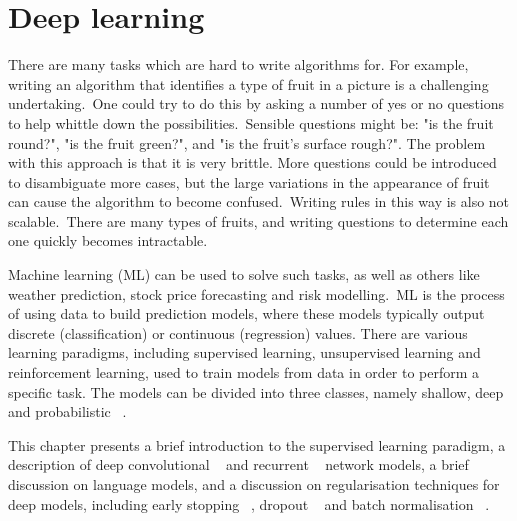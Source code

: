 
\chapter{Deep learning}

\ifpdf
     \graphicspath{{Figs/Chapter2/}}
\else
    \graphicspath{{Chapter2/Figs/Vector/}{Chapter2/Figs/}}
\fi


There are many tasks which are hard to write algorithms for. For example, writing an algorithm that identifies a type of fruit in a picture is a challenging undertaking.\ One could try to do this by asking a number of yes or no questions to help whittle down the possibilities.\ Sensible questions might be: "is the fruit round?", "is the fruit green?", and "is the fruit's surface rough?". The problem with this approach is that it is very brittle. More questions could be introduced to disambiguate more cases, but the large variations in the appearance of fruit can cause the algorithm to become confused.\ Writing rules in this way is also not scalable.\ There are many types of fruits, and writing questions to determine each one quickly becomes intractable. \par
 
\noindent Machine learning (ML) can be used to solve such tasks, as well as others like weather prediction, stock price forecasting and risk modelling.\ ML is the process of using data to build prediction models, where these models typically output discrete (classification) or continuous (regression) values. There are various learning paradigms, including supervised learning, unsupervised learning and reinforcement learning, used to train models from data in order to perform a specific task. The models can be divided into three classes, namely shallow, deep and probabilistic ~\citep{hastie2009elements}. \par

\noindent This chapter presents a brief introduction to the supervised learning paradigm, a description of deep convolutional \unskip ~\citep{lecun1998gradient} and recurrent \unskip ~\citep{werbos1988generalization} network models, a brief discussion on language models, and a discussion on regularisation techniques for deep models, including early stopping \unskip~\citep{prechelt1998early}, dropout \unskip ~\citep{srivastava2014dropout} and batch normalisation \unskip ~\citep{ioffe2015batch}. 


